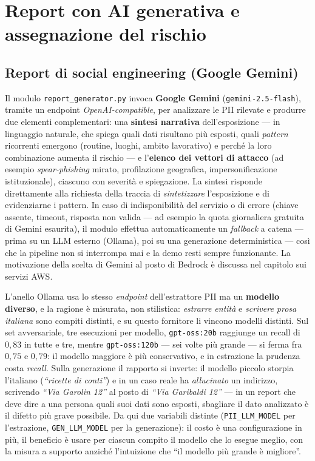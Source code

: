 \documentclass[11pt,a4paper]{article}
\begin{document}
\section{Report con AI generativa e assegnazione del rischio}
\subsection{Report di social engineering (Google Gemini)}
Il modulo \texttt{report\_generator.py} invoca \textbf{Google Gemini}
(\texttt{gemini-2.5-flash}), tramite un endpoint \emph{OpenAI-compatible}, per analizzare
le PII rilevate e produrre due elementi
complementari: una \textbf{sintesi narrativa} dell'esposizione --- in linguaggio
naturale, che spiega quali dati risultano più esposti, quali \emph{pattern} ricorrenti
emergono (routine, luoghi, ambito lavorativo) e perché la loro combinazione aumenta il
rischio --- e l'\textbf{elenco dei vettori di attacco} (ad esempio \emph{spear-phishing}
mirato, profilazione geografica, impersonificazione istituzionale), ciascuno con severità
e spiegazione. La sintesi risponde direttamente alla richiesta della traccia di
\emph{sintetizzare} l'esposizione e di evidenziarne i pattern. In caso di indisponibilità
del servizio o di errore (chiave assente, timeout, risposta non valida — ad esempio la quota
giornaliera gratuita di Gemini esaurita), il modulo effettua automaticamente un \emph{fallback}
a catena --- prima su un LLM esterno (Ollama), poi su una generazione deterministica --- così
che la pipeline non si interrompa mai e la demo resti sempre funzionante. La motivazione della
scelta di Gemini al posto di Bedrock è discussa nel capitolo sui servizi AWS.

L'anello Ollama usa lo stesso \emph{endpoint} dell'estrattore PII ma un \textbf{modello
diverso}, e la ragione è misurata, non stilistica: \emph{estrarre entità} e \emph{scrivere
prosa italiana} sono compiti distinti, e su questo fornitore li vincono modelli distinti.
Sul set avversariale, tre esecuzioni per modello, \texttt{gpt-oss:20b} raggiunge un recall
di $0{,}83$ in tutte e tre, mentre \texttt{gpt-oss:120b} --- sei volte più grande --- si
ferma fra $0{,}75$ e $0{,}79$: il modello maggiore è più conservativo, e in estrazione la
prudenza costa \emph{recall}. Sulla generazione il rapporto si inverte: il modello piccolo
storpia l'italiano (\emph{``ricette di conti''}) e in un caso reale ha \emph{allucinato} un
indirizzo, scrivendo \emph{``Via Garolin 12''} al posto di \emph{``Via Garibaldi 12''} ---
in un report che deve dire a una persona quali suoi dati sono esposti, sbagliare il dato
analizzato è il difetto più grave possibile. Da qui due variabili distinte
(\texttt{PII\_LLM\_MODEL} per l'estrazione, \texttt{GEN\_LLM\_MODEL} per la generazione):
il costo è una configurazione in più, il beneficio è usare per ciascun compito il modello
che lo esegue meglio, con la misura a supporto anziché l'intuizione che ``il modello più
grande è migliore''.
\end{document}
